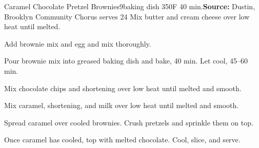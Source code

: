 \begin{recipe}{Caramel Chocolate Pretzel Brownies}{9\inch{}\inch baking dish \hfill 350\0F \hfill 40 min.}{\textbf{Source:} Dustin, Brooklyn Community Chorus \hfill serves 24}
 Mix butter and cream cheese over low heat until melted.

 Add brownie mix and egg and mix thoroughly.

 \newstep Pour brownie mix into greased baking dish and bake, 40 min. Let cool, 45--60 min.

 Mix chocolate chips and shortening over low heat until melted and smooth.

 Mix caramel, shortening, and milk over low heat until melted and smooth.

 Spread caramel over cooled brownies. Crush pretzels and sprinkle them on top.

 \newstep Once caramel has cooled, top with melted chocolate. Cool, slice, and serve.

\end{recipe}
